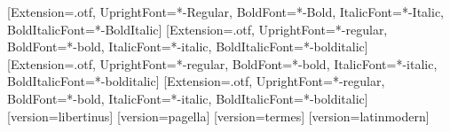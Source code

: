 \newfontfamily{}[Extension=.otf, UprightFont=*-Regular, BoldFont=*-Bold, ItalicFont=*-Italic, BoldItalicFont=*-BoldItalic]
\newfontfamily{}[Extension=.otf, UprightFont=*-regular, BoldFont=*-bold, ItalicFont=*-italic, BoldItalicFont=*-bolditalic]
\newfontfamily{}[Extension=.otf, UprightFont=*-regular, BoldFont=*-bold, ItalicFont=*-italic, BoldItalicFont=*-bolditalic]
\newfontfamily{}[Extension=.otf, UprightFont=*-regular, BoldFont=*-bold, ItalicFont=*-italic, BoldItalicFont=*-bolditalic]
[version=libertinus]
[version=pagella]
[version=termes]
[version=latinmodern]
\makeatletter
{}
\makeatother
\usepackage{fancyhdr}
\usepackage{lastpage}
\pagestyle{fancy}
\fancyfoot[C]{\thepage\ / \pageref*{LastPage}}
